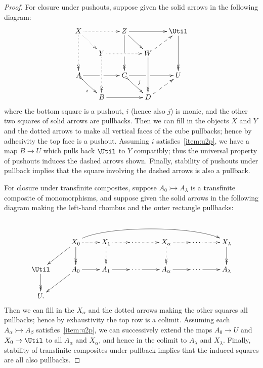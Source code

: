 \documentclass{amsart}
\let\al\alpha
\let\be\beta
\let\la\lambda
\let\cof\rightarrowtail
\theoremstyle{remark}
{\newtheorem{{rmk}}[thm]{{Remark}}}
\numberwithin{equation}{section}
\theoremstyle{plain}
\begin{document}
\begin{proof}
  For closure under pushouts, suppose given the solid arrows in the following diagram:
  \[ \xymatrix@-.5pc{
    X \ar@{.>}[rr] \ar@{.>>}[dd] \ar@{.>}[dr] &&
    Z \ar@{->>}'[d][dd] \ar[dr] \ar[rr] &&
    \Util \ar@{->>}[dd]\\
    & Y \ar@{.>>}[dd] \ar@{.>}[rr] &&
    W \ar@{->>}[dd] \ar@{-->}[ur] \\
    A \ar@{>->}[dr]_i \ar'[r][rr] & &
    C \ar@{>->}[dr]^j \ar'[r][rr] && U\\
    & B \ar[rr] &&
    D\ar@{-->}[ur]
  }\]
  where the bottom square is a pushout, $i$ (hence also $j$) is monic, and the other two squares of solid arrows are pullbacks.
  Then we can fill in the objects $X$ and $Y$ and the dotted arrows to make all vertical faces of the cube pullbacks; hence by adhesivity the top face is a pushout.
  Assuming $i$ satisfies~\ref{item:u2p}, we have a map $B\to U$ which pulls back $\Util$ to $Y$ compatibly; thus the universal property of pushouts induces the dashed arrows shown.
  Finally, stability of pushouts under pullback implies that the square involving the dashed arrows is also a pullback.

  For closure under transfinite composites, suppose $A_0 \cof A_\la$ is a transfinite composite of monomorphisms, and suppose given the solid arrows in the following diagram making the left-hand rhombus and the outer rectangle pullbacks:
  \[\vcenter{\xymatrix{
      \\
      &X_0\ar@{.>}[r]\ar@{->>}[d] \ar[dl] \ar@(ur,ul)[rrrrr] &
      X_1\ar@{.>}[r]\ar@{.>>}[d] &
      \cdots\ar@{.>}[r] &
      X_\al\ar@{.>}[r]\ar@{.>>}[d] &
      \cdots\ar@{.>}[r] &
      X_\la\ar@{->>}[d]\\
      \Util\ar@{->>}[d] &A_0\ar[r] \ar[dl] &
      A_1\ar[r] &
      \cdots\ar[r] &
      A_\al\ar[r] &
      \cdots\ar[r] &
      A_\la\\
      U.
    }}\]
  Then we can fill in the $X_\al$ and the dotted arrows making the other squares all pullbacks; hence by exhaustivity the top row is a colimit.
  Assuming each $A_\al \cof A_\be$ satisfies~\ref{item:u2p}, we can successively extend the maps $A_0 \to U$ and $X_0 \to \Util$ to all $A_\al$ and $X_\al$, and hence in the colimit to $A_\la$ and $X_\la$.
  Finally, stability of transfinite composites under pullback implies that the induced squares are all also pullbacks.


\end{proof}
\end{document}
